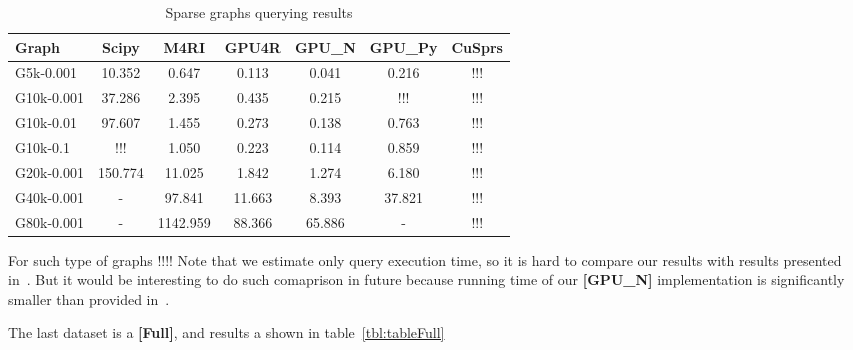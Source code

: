 {\setlength{\tabcolsep}{0.4em}
\begin{table}[H]
\caption{Sparse graphs querying results}
\label{tbl:tableSparse}
\begin{tabular}{| l | c | c | c | c | c | c | }
    \hline
    Graph              & Scipy   & M4RI     & GPU4R  & GPU\_N & GPU\_Py & CuSprs  \\
    \hline
    \hline
    \small{G5k-0.001}  & 10.352  & 0.647    & 0.113  & 0.041  & 0.216   & !!!     \\
    \small{G10k-0.001} & 37.286  & 2.395    & 0.435  & 0.215  & !!!     & !!!     \\
    \small{G10k-0.01}  & 97.607  & 1.455    & 0.273  & 0.138  & 0.763   & !!!     \\
    \small{G10k-0.1}   & !!!     & 1.050    & 0.223  & 0.114  & 0.859   & !!!     \\
    \small{G20k-0.001} & 150.774 & 11.025   & 1.842  & 1.274  & 6.180   & !!!     \\
    \small{G40k-0.001} & -       & 97.841   & 11.663 & 8.393  & 37.821  & !!!     \\
    \small{G80k-0.001} & -       & 1142.959 & 88.366 & 65.886 & -       & !!!     \\
    \hline
  \end{tabular}
\end{table}  
}


For such type of graphs !!!!
Note that we estimate only query execution time, so it is hard to compare our results with results presented in~\cite{fan2018scaling}.
But it would be interesting to do such comaprison in future because running time of our \textbf{[GPU\_N]} implementation is significantly smaller than provided in~\cite{fan2018scaling}.

The last dataset is a \textbf{[Full]}, and results a shown in table~\ref{tbl:tableFull}


